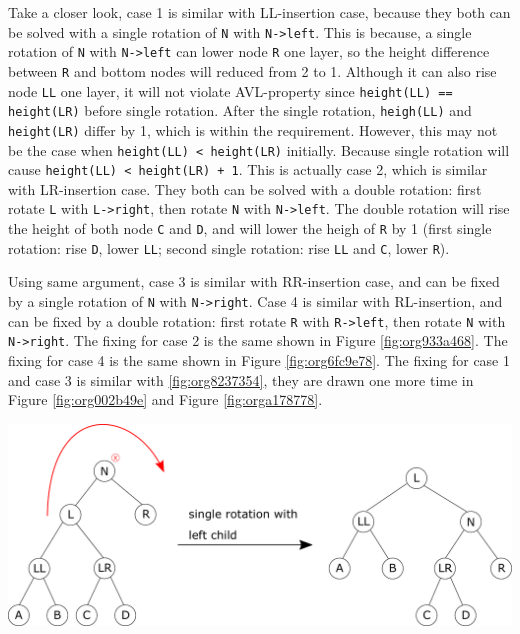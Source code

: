 \documentclass[11pt]{book}
\begin{document}
Take a closer look, case 1 is similar with LL-insertion case, because they both can be solved with a single rotation of \texttt{N} with \texttt{N->left}. This is because, a single rotation of \texttt{N} with \texttt{N->left} can lower node \texttt{R} one layer, so the height difference between \texttt{R} and bottom nodes will reduced from 2 to 1. Although it can also rise node \texttt{LL} one layer, it will not violate AVL-property since \texttt{height(LL) == height(LR)} before single rotation. After the single rotation, \texttt{heigh(LL)} and \texttt{height(LR)} differ by 1, which is within the requirement. However, this may not be the case when \texttt{height(LL) < height(LR)} initially. Because single rotation will cause \texttt{height(LL) < height(LR) + 1}. This is actually case 2, which is similar with LR-insertion case. They both can be solved with a double rotation: first rotate \texttt{L} with \texttt{L->right}, then rotate \texttt{N} with \texttt{N->left}. The double rotation will rise the height of both node \texttt{C} and \texttt{D}, and will lower the heigh of \texttt{R} by 1 (first single rotation: rise \texttt{D}, lower \texttt{LL}; second single rotation: rise \texttt{LL} and \texttt{C}, lower \texttt{R}).

Using same argument, case 3 is similar with RR-insertion case, and can be fixed by a single rotation of \texttt{N} with \texttt{N->right}. Case 4 is similar with RL-insertion, and can be fixed by a double rotation: first rotate \texttt{R} with \texttt{R->left}, then rotate \texttt{N} with \texttt{N->right}. The fixing for case 2 is the same shown in Figure \ref{fig:org933a468}. The fixing for case 4 is the same shown in Figure \ref{fig:org6fc9e78}. The fixing for case 1 and case 3 is similar with \ref{fig:org8237354}, they are drawn one more time in Figure \ref{fig:org002b49e} and Figure \ref{fig:orga178778}.

\begin{center}
\includegraphics[width=400pt]{./img/AVL-deletion-LL-fix.pdf}
\end{center}
\end{document}
